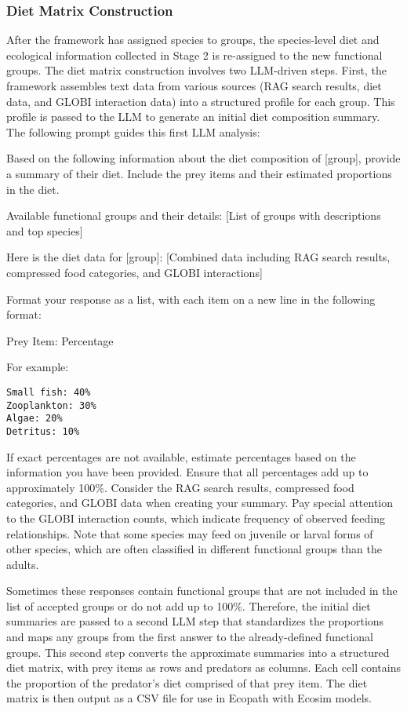 \subsubsection{Diet Matrix Construction}

After the framework has assigned species to groups, the species-level diet and ecological information collected in Stage 2 is re-assigned to the new functional groups. The diet matrix construction involves two LLM-driven steps. First, the framework assembles text data from various sources (RAG search results, diet data, and GLOBI interaction data) into a structured profile for each group. This profile is passed to the LLM to generate an initial diet composition summary. The following prompt guides this first LLM analysis:

\begin{prompt}
Based on the following information about the diet composition of [group], provide a summary of their diet. Include the prey items and their estimated proportions in the diet.

Available functional groups and their details:
[List of groups with descriptions and top species]

Here is the diet data for [group]:
[Combined data including RAG search results, compressed food categories, and GLOBI interactions]

Format your response as a list, with each item on a new line in the following format:

Prey Item: Percentage

For example:
\begin{verbatim}
Small fish: 40%
Zooplankton: 30%
Algae: 20%
Detritus: 10%
\end{verbatim}

If exact percentages are not available, estimate percentages based on the information you have been provided.
Ensure that all percentages add up to approximately 100\%.
Consider the RAG search results, compressed food categories, and GLOBI data when creating your summary.
Pay special attention to the GLOBI interaction counts, which indicate frequency of observed feeding relationships.
Note that some species may feed on juvenile or larval forms of other species, which are often classified in different functional groups than the adults.
\end{prompt}

Sometimes these responses contain functional groups that are not included in the list of accepted groups or do not add up to 100\%. Therefore, the initial diet summaries are passed to a second LLM step that standardizes the proportions and maps any groups from the first answer to the already-defined functional groups. This second step converts the approximate summaries into a structured diet matrix, with prey items as rows and predators as columns. Each cell contains the proportion of the predator's diet comprised of that prey item. The diet matrix is then output as a CSV file for use in Ecopath with Ecosim models. 

